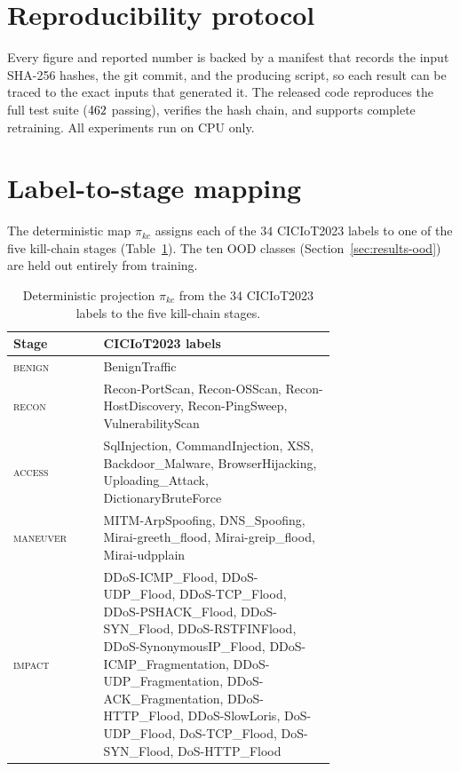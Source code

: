 \documentclass[3p,twocolumn]{elsarticle}
\begin{document}
\appendix
\section{Reproducibility protocol}
\label{app:repro}
Every figure and reported number is backed by a manifest that records the
input SHA-256 hashes, the git commit, and the producing script, so each result
can be traced to the exact inputs that generated it. The released code
reproduces the full test suite ($462$ passing), verifies the hash chain,
and supports complete retraining. All experiments run on CPU only.

\section{Label-to-stage mapping}
\label{app:mapping}
The deterministic map $\pi_{kc}$ assigns each of the $34$ CICIoT2023 labels to
one of the five kill-chain stages (Table~\ref{tab:mapping}). The ten OOD classes
(Section~\ref{sec:results-ood}) are held out entirely from training.

\begin{table}[tbp]
\centering
\footnotesize
\caption{Deterministic projection $\pi_{kc}$ from the 34 CICIoT2023 labels to
the five kill-chain stages.}
\label{tab:mapping}
\begin{tabular}{@{}l p{0.72\linewidth}@{}}
\toprule
Stage & CICIoT2023 labels \\
\midrule
\textsc{benign} & BenignTraffic \\
\textsc{recon} & Recon-PortScan, Recon-OSScan, Recon-HostDiscovery,
Recon-PingSweep, VulnerabilityScan \\
\textsc{access} & SqlInjection, CommandInjection, XSS, Backdoor\_Malware,
BrowserHijacking, Uploading\_Attack, DictionaryBruteForce \\
\textsc{maneuver} & MITM-ArpSpoofing, DNS\_Spoofing, Mirai-greeth\_flood,
Mirai-greip\_flood, Mirai-udpplain \\
\textsc{impact} & DDoS-ICMP\_Flood, DDoS-UDP\_Flood, DDoS-TCP\_Flood,
DDoS-PSHACK\_Flood, DDoS-SYN\_Flood, DDoS-RSTFINFlood, DDoS-SynonymousIP\_Flood,
DDoS-ICMP\_Fragmentation, DDoS-UDP\_Fragmentation, DDoS-ACK\_Fragmentation,
DDoS-HTTP\_Flood, DDoS-SlowLoris, DoS-UDP\_Flood, DoS-TCP\_Flood, DoS-SYN\_Flood,
DoS-HTTP\_Flood \\
\bottomrule
\end{tabular}
\end{table}
\end{document}

